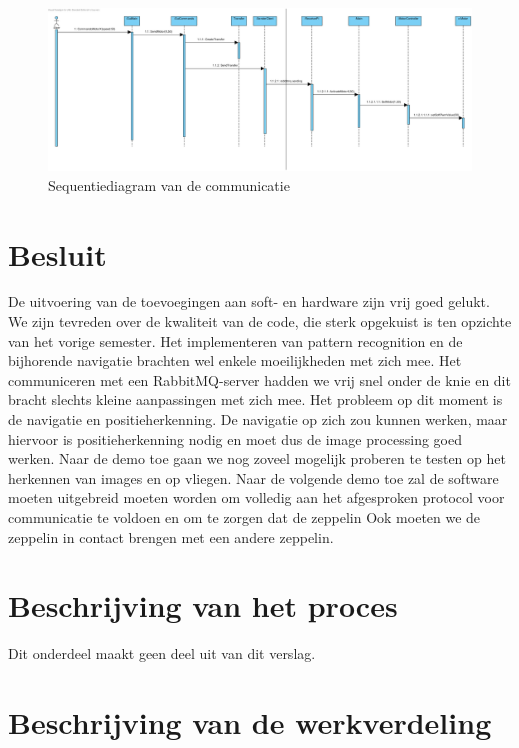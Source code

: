 \documentclass[tt]{penoverslag}
\begin{document}
\begin{figure}[H]
\begin{center}
\includegraphics[width=1\textwidth]{PiToClientCommunication.png}
\end{center}
\caption{Sequentiediagram van de communicatie}
\label{Sequence}
\end{figure}






\section{Besluit}
De uitvoering van de toevoegingen aan soft- en hardware zijn vrij goed gelukt. We zijn tevreden over de kwaliteit van de code, die sterk opgekuist is ten opzichte van het vorige semester. Het implementeren van pattern recognition en de bijhorende navigatie brachten wel enkele moeilijkheden met zich mee. Het communiceren met een RabbitMQ-server hadden we vrij snel onder de knie en dit bracht slechts kleine aanpassingen met zich mee. Het probleem op dit moment is de navigatie en positieherkenning. De navigatie op zich zou kunnen werken, maar hiervoor is positieherkenning nodig en moet dus de image processing goed werken.
Naar de demo toe gaan we nog zoveel mogelijk proberen te testen op het herkennen van images en op vliegen.
Naar de volgende demo toe zal de software moeten uitgebreid moeten worden om volledig aan het afgesproken protocol voor communicatie te voldoen en om te zorgen dat de zeppelin Ook moeten we de zeppelin in contact brengen met een andere zeppelin. 

\newpage\makeappendix

\section{Beschrijving van het proces}
Dit onderdeel maakt geen deel uit van dit verslag.


\section{Beschrijving van de werkverdeling}
\end{document}
